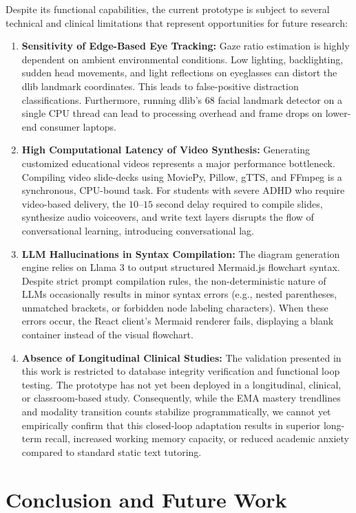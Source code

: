 \documentclass[final,5p,times,twocolumn,authoryear]{elsarticle}
\begin{document}
Despite its functional capabilities, the current prototype is subject to several technical and clinical limitations that represent opportunities for future research:
\begin{enumerate}
    \item \textbf{Sensitivity of Edge-Based Eye Tracking:} Gaze ratio estimation is highly dependent on ambient environmental conditions. Low lighting, backlighting, sudden head movements, and light reflections on eyeglasses can distort the dlib landmark coordinates. This leads to false-positive distraction classifications. Furthermore, running dlib's 68 facial landmark detector on a single CPU thread can lead to processing overhead and frame drops on lower-end consumer laptops.
    \item \textbf{High Computational Latency of Video Synthesis:} Generating customized educational videos represents a major performance bottleneck. Compiling video slide-decks using MoviePy, Pillow, gTTS, and FFmpeg is a synchronous, CPU-bound task. For students with severe ADHD who require video-based delivery, the $10$--$15$ second delay required to compile slides, synthesize audio voiceovers, and write text layers disrupts the flow of conversational learning, introducing conversational lag.
    \item \textbf{LLM Hallucinations in Syntax Compilation:} The diagram generation engine relies on Llama 3 to output structured Mermaid.js flowchart syntax. Despite strict prompt compilation rules, the non-deterministic nature of LLMs occasionally results in minor syntax errors (e.g., nested parentheses, unmatched brackets, or forbidden node labeling characters). When these errors occur, the React client's Mermaid renderer fails, displaying a blank container instead of the visual flowchart.
    \item \textbf{Absence of Longitudinal Clinical Studies:} The validation presented in this work is restricted to database integrity verification and functional loop testing. The prototype has not yet been deployed in a longitudinal, clinical, or classroom-based study. Consequently, while the EMA mastery trendlines and modality transition counts stabilize programmatically, we cannot yet empirically confirm that this closed-loop adaptation results in superior long-term recall, increased working memory capacity, or reduced academic anxiety compared to standard static text tutoring.
\end{enumerate}

\section{Conclusion and Future Work}
\label{sec:conclusion}
\end{document}

